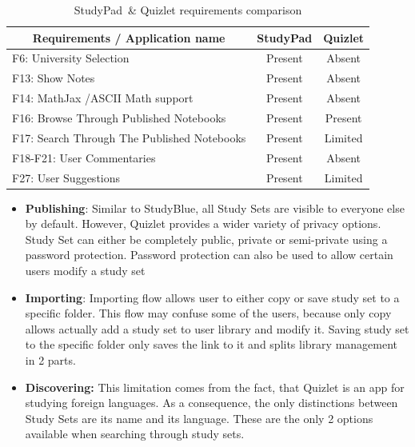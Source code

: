 \documentclass[thesis=B,english]{FITthesis}[2012/10/20]
\newcommand{\appname}{StudyPad}
\begin{document}
\begin{table}[H]
\caption{\appname\ \& Quizlet requirements comparison}
\label{tab:quizlet}
\begin{tabular}{|l|c|c|}
\hline
\multicolumn{1}{|c|}{\textbf{Requirements / Application name}} & \multicolumn{1}{l|}{\textbf{StudyPad}} & \multicolumn{1}{l|}{\textbf{Quizlet}} \\ \hline
F6: University Selection                                       & Present                                & Absent                                \\ \hline
F13: Show Notes                                                & Present                                & Absent                                \\ \hline
F14: MathJax /ASCII Math support                               & Present                                & Absent                                \\ \hline
F16: Browse Through Published Notebooks                        & Present                                & Present                               \\ \hline
F17: Search Through The Published Notebooks                    & Present                                & Limited                               \\ \hline
F18-F21: User Commentaries                                     & Present                                & Absent                                \\ \hline
F27: User Suggestions                                          & Present                                & Limited                               \\ \hline
\end{tabular}
\end{table}

\begin{itemize}
	\item \textbf{Publishing}: Similar to StudyBlue, all Study Sets are visible to everyone else by default. However, Quizlet provides a wider variety of privacy options. Study Set can either be completely public, private or semi-private using a password protection. Password protection can also be used to allow certain users modify a study set
	\item \textbf{Importing}: Importing flow allows user to either copy or save study set to a specific folder. This flow may confuse some of the users, because only copy allows actually add a study set to user library and modify it. Saving study set to the specific folder only saves the link to it and splits library management in 2 parts.
	\item \textbf{Discovering:} This limitation comes from the fact, that Quizlet is an app for studying foreign  languages. As a consequence, the only distinctions between Study Sets are its name and its language. These are the only 2 options available when searching through study sets.

\end{itemize}
\end{document}
